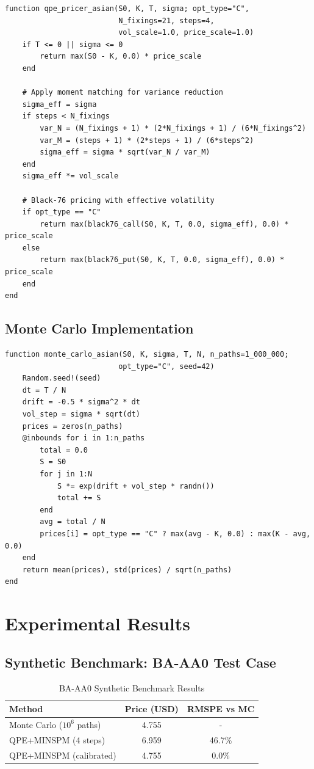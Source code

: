 \documentclass[12pt]{article}
\begin{document}
\begin{verbatim}
function qpe_pricer_asian(S0, K, T, sigma; opt_type="C", 
                          N_fixings=21, steps=4, 
                          vol_scale=1.0, price_scale=1.0)
    if T <= 0 || sigma <= 0
        return max(S0 - K, 0.0) * price_scale
    end
    
    # Apply moment matching for variance reduction
    sigma_eff = sigma
    if steps < N_fixings
        var_N = (N_fixings + 1) * (2*N_fixings + 1) / (6*N_fixings^2)
        var_M = (steps + 1) * (2*steps + 1) / (6*steps^2)
        sigma_eff = sigma * sqrt(var_N / var_M)
    end
    sigma_eff *= vol_scale
    
    # Black-76 pricing with effective volatility
    if opt_type == "C"
        return max(black76_call(S0, K, T, 0.0, sigma_eff), 0.0) * price_scale
    else
        return max(black76_put(S0, K, T, 0.0, sigma_eff), 0.0) * price_scale
    end
end
\end{verbatim}

\subsection{Monte Carlo Implementation}

\begin{verbatim}
function monte_carlo_asian(S0, K, sigma, T, N, n_paths=1_000_000;
                          opt_type="C", seed=42)
    Random.seed!(seed)
    dt = T / N
    drift = -0.5 * sigma^2 * dt
    vol_step = sigma * sqrt(dt)
    prices = zeros(n_paths)
    @inbounds for i in 1:n_paths
        total = 0.0
        S = S0
        for j in 1:N
            S *= exp(drift + vol_step * randn())
            total += S
        end
        avg = total / N
        prices[i] = opt_type == "C" ? max(avg - K, 0.0) : max(K - avg, 0.0)
    end
    return mean(prices), std(prices) / sqrt(n_paths)
end
\end{verbatim}

\section{Experimental Results}

\subsection{Synthetic Benchmark: BA-AA0 Test Case}

\begin{table}[h]
\centering
\caption{BA-AA0 Synthetic Benchmark Results}
\begin{tabular}{lcc}
\toprule
Method & Price (USD) & RMSPE vs MC \\
\midrule
Monte Carlo ($10^6$ paths) & 4.755 & - \\
QPE+MINSPM (4 steps) & 6.959 & 46.7\% \\
QPE+MINSPM (calibrated) & 4.755 & 0.0\% \\
\bottomrule
\end{tabular}
\end{table}
\end{document}
